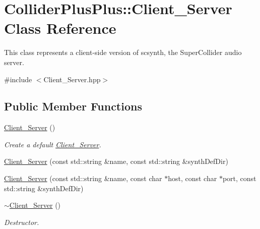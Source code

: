 \hypertarget{classColliderPlusPlus_1_1Client__Server}{\section{Collider\-Plus\-Plus\-:\-:Client\-\_\-\-Server Class Reference}
\label{classColliderPlusPlus_1_1Client__Server}
}


This class represents a client-\/side version of scsynth, the Super\-Collider audio server.  




{\ttfamily \#include $<$Client\-\_\-\-Server.\-hpp$>$}

\subsection*{Public Member Functions}
\begin{DoxyCompactItemize}
\item 
\hypertarget{classColliderPlusPlus_1_1Client__Server_a0306469449d798015a2015a6af739136}{\hyperlink{classColliderPlusPlus_1_1Client__Server_a0306469449d798015a2015a6af739136}{Client\-\_\-\-Server} ()}\label{classColliderPlusPlus_1_1Client__Server_a0306469449d798015a2015a6af739136}

\begin{DoxyCompactList}\small\item\em Create a default \hyperlink{classColliderPlusPlus_1_1Client__Server}{Client\-\_\-\-Server}. \end{DoxyCompactList}\item 
\hyperlink{classColliderPlusPlus_1_1Client__Server_a76fc49a882d471430c948bec576bd23d}{Client\-\_\-\-Server} (const std\-::string \&name, const std\-::string \&synth\-Def\-Dir)
\item 
\hyperlink{classColliderPlusPlus_1_1Client__Server_a7782b29b222bfcd1e2a1fb880b257eb8}{Client\-\_\-\-Server} (const std\-::string \&name, const char $\ast$host, const char $\ast$port, const std\-::string \&synth\-Def\-Dir)
\item 
\hypertarget{classColliderPlusPlus_1_1Client__Server_a98278883ff8e04fea0214036def907ff}{\hyperlink{classColliderPlusPlus_1_1Client__Server_a98278883ff8e04fea0214036def907ff}{$\sim$\-Client\-\_\-\-Server} ()}\label{classColliderPlusPlus_1_1Client__Server_a98278883ff8e04fea0214036def907ff}

\begin{DoxyCompactList}\small\item\em Destructor. \end{DoxyCompactList}\end{DoxyCompactItemize}
